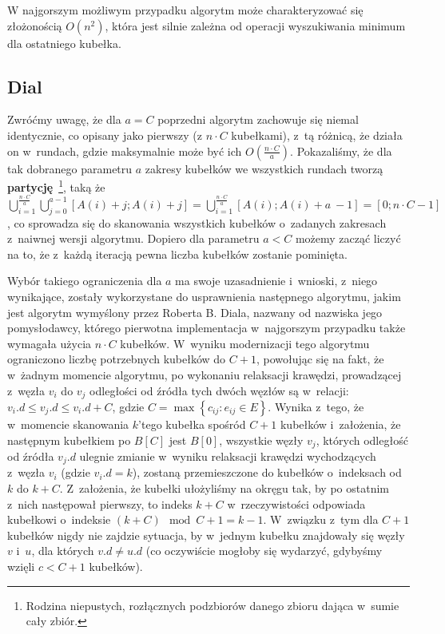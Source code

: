 W najgorszym możliwym przypadku algorytm może charakteryzować się złożonością $ O \left( n^{2} \right)$, która jest silnie zależna od operacji wyszukiwania minimum dla ostatniego kubełka.

\subsection{Dial}

Zwróćmy uwagę, że dla $a=C$ poprzedni algorytm zachowuje się niemal identycznie, co opisany jako pierwszy (z $n \cdot C$ kubełkami), z~tą różnicą, że działa on w~rundach, gdzie maksymalnie może być ich $ O \left( \frac{n \cdot C}{a} \right) $. Pokazaliśmy, że dla tak dobranego parametru $a$ zakresy kubełków we wszystkich rundach tworzą \textbf{partycję}~\footnote{Rodzina niepustych, rozłącznych podzbiorów danego zbioru dająca w~sumie cały zbiór.}, taką że $\bigcup _{i=1}^{\frac{n \cdot C}{a}} \bigcup _{j=0}^{a-1} \left[ A \left( i \right ) + j ; A \left( i \right ) + j \right ] = \bigcup _{i=1}^{\frac{n \cdot C}{a}} \left[ A \left( i \right ) ; A \left( i \right ) + a~- 1 \right ] = \left[ 0 ; n \cdot C - 1 \right ]$, co sprowadza się do skanowania wszystkich kubełków o~zadanych zakresach z~naiwnej wersji algorytmu. Dopiero dla parametru $a < C$ możemy zacząć liczyć na to, że z~każdą iteracją pewna liczba kubełków zostanie pominięta. 

Wybór takiego ograniczenia dla $a$ ma swoje uzasadnienie i~wnioski, z~niego wynikające, zostały wykorzystane do usprawnienia następnego algorytmu, jakim jest algorytm wymyślony przez Roberta B. Diala, nazwany od nazwiska jego pomysłodawcy, którego pierwotna implementacja w~najgorszym przypadku także wymagała użycia $n \cdot C$ kubełków. W~wyniku modernizacji tego algorytmu ograniczono liczbę potrzebnych kubełków do $C+1$, powołując się na fakt, że w~żadnym momencie algorytmu, po wykonaniu relaksacji krawędzi, prowadzącej z~węzła $v_{i}$ do $v_{j}$ odległości od źródła tych dwóch węzłów są w~relacji: $v_{i}.d \leqslant v_{j}.d \leqslant v_{i}.d + C$, gdzie $C = \max \left\{ c_{ij} : e_{ij} \in E \right\}$. Wynika z~tego, że w~momencie skanowania $k$'tego kubełka spośród $C + 1$ kubełków i~założenia, że następnym kubełkiem po $B \left[ C \right] $ jest $B \left[ 0 \right] $, wszystkie węzły $v_{j}$, których odległość od źródła $v_{j}.d$ ulegnie zmianie w~wyniku relaksacji krawędzi wychodzących z~węzła $v_{i}$ (gdzie $v_{i}.d = k$), zostaną przemieszczone do kubełków o~indeksach od $k$ do $k + C$. Z~założenia, że kubełki ułożyliśmy na okręgu tak, by po ostatnim z~nich następował pierwszy, to indeks $k + C$ w~rzeczywistości odpowiada kubełkowi o~indeksie $ \left( k + C \right) \mod{C+1} = k - 1$. W~związku z~tym dla $C+1$ kubełków nigdy nie zajdzie sytuacja, by w~jednym kubełku znajdowały się węzły $v$ i~$u$, dla których $v.d \neq u.d$ (co oczywiście mogłoby się wydarzyć, gdybyśmy wzięli $c < C + 1$ kubełków).

